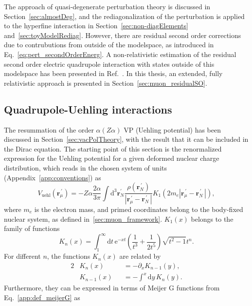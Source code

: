 The approach of quasi-degenerate perturbation theory is discussed in Section~\ref{sec:almostDeg}, and the rediagonalization of the perturbation is applied to the hyperfine interaction in Section~\ref{sec:non-diagElements} and~\ref{sec:toyModelRediag}. However, there are residual second order corrections due to contrubutions from outside of the modelspace, as introduced in Eq.~\eqref{eq:pert_secondOrderEnerg}. A non-relativistic estimation of the residual second order electric quadrupole interaction with states outside of this modelspace has been presented in Ref.~\cite{chen1970}. In this thesis, an extended, fully relativistic approach is presented in Section~\ref{sec:muon_residualSO}.

\subsection{Quadrupole-Uehling interactions}
\label{sec:muon_quadUehl}
The resummation of the order $\alpha (Z\alpha)$ VP (Uehling potential) has been discussed in Section~\ref{sec:vacPolTheory}, with the result that it can be included in the Dirac equation. The starting point of this section is the renormalized expression for the Uehling potential for a given deformed nuclear charge distribution, which reads in the chosen system of units (Appendix~\ref{app:conventions}) as~\cite{Fullerton1976}
\begin{equation}
{V_{\text{uehl}}(\mathbf{r}_\mu^{\,\prime})}{=}{-Z\alpha\frac{2 \alpha}{3\pi} \int \text{d}^3\mathbf{r}_N^{\prime} \frac{\rho(\mathbf{r}_N^{\,\prime})}{|\mathbf{r}_\mu^{\,\prime} - \mathbf{r}_N^{\,\prime}\,|} K_1(2m_e{|\mathbf{r}_\mu^{\,\prime} - \mathbf{r}_N^{\,\prime}\,|}),}
\label{eq:Vvp}
\end{equation}
where $m_e$ is the electron mass, and primed coordinates belong to the body-fixed nuclear system, as defined in~\ref{sec:muon_framework}. $K_1(x)$ belongs to the family of functions
\begin{equation}
K_n(x)=\int_1^\infty \text{d}t\,\text{e}^{-xt}\left(\frac{1}{t^3}+\frac{1}{2t^5}\right)\sqrt{t^2-1}t^n.
\label{eq:defKn}
\end{equation}
For different $n$, the functions $K_n(x)$ are related by
\begin{alignat}{2}
&K_n(x)&&=-\partial_x K_{n-1}(y),\\
&K_{n-1}(x)&&=-\int^x\text{d}y\, K_n(y).
\label{eq:Kninfo}
\end{alignat}
Furthermore, they can be expressed in terms of Meijer G functions from Eq.~\eqref{app:def_meijerG} as
